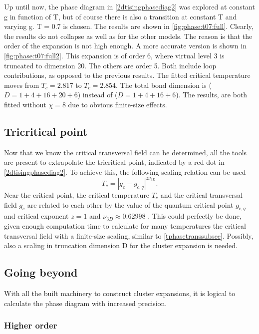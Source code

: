 \noindent
Up until now, the phase diagram in \cref{2dtisingphasediag2} was explored at constant g in function of T, but of course there is also a transition at constant T and varying g.  T = 0.7 is chosen. The results are shown in \cref{fig:phase:t07:full}. Clearly, the results do not collapse as well as for the other models. The reason is that the order of the expansion is not high enough.
A more accurate version is shown in \cref{fig:phase:t07:full2}. This expansion is of order 6, where virtual level 3 is truncated to dimension 20. The others are order 5. Both include loop contributions, as opposed to the previous results. The fitted critical temperature moves from $T_c = 2.817$ to $T_c = 2.854$. The total bond dimension is ($D = 1+4+16+20 +6$) instead of ($D = 1+4+16 +6 $). The results, are both fitted without $\chi=8$ due to obvious finite-size effects.

\subsection{Tricritical point}\label{subsec:tricrit}

Now that we know the critical transversal field can be determined, all the tools are present to extrapolate the tricritical point, indicated by a red dot in \cref{2dtisingphasediag2}. To achieve this, the following scaling relation can be used
\begin{equation}
  T_c = \left| g_c-g_{c,q} \right|^{z \nu_{3D}} .
\end{equation}
Near the critical point, the critical temperature $T_c$ and the critical transversal field $g_c$ are related to each other by the value of the quantum critical point $g_{c,q}$ and critical exponent $z=1$ and $\nu_{3D} \approx 0.62998$ \cite{Hesselmann2016}. This could perfectly be done, given enough computation time to calculate for many temperatures the critical transversal field with a finite-size scaling, similar to \cref{tphasetranssubsec}. Possibly, also a scaling in truncation dimension D for the cluster expansion is needed.

\subsection{Going beyond}
With all the built machinery to construct cluster expansions, it is logical to calculate the phase diagram with increased precision.

\subsubsection{Higher order}

